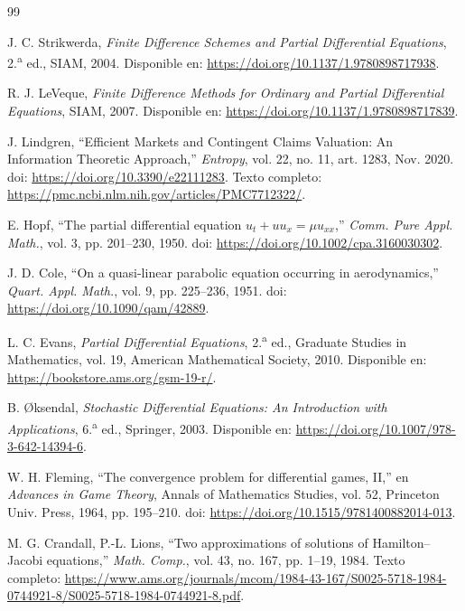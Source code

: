 \documentclass[11pt,letterpaper]{article}
\theoremstyle{plain}
\theoremstyle{definition}
\theoremstyle{remark}
\numberwithin{equation}{section}
\begin{document}
	\begin{thebibliography}{99}\small
		
		J. C. Strikwerda, \emph{Finite Difference Schemes and Partial Differential Equations}, 2.\textsuperscript{a} ed., SIAM, 2004.
		Disponible en: \url{https://doi.org/10.1137/1.9780898717938}.
		
		R. J. LeVeque, \emph{Finite Difference Methods for Ordinary and Partial Differential Equations}, SIAM, 2007.
		Disponible en: \url{https://doi.org/10.1137/1.9780898717839}.
		
		J. Lindgren, ``Efficient Markets and Contingent Claims Valuation: An Information Theoretic Approach,'' \emph{Entropy}, vol. 22, no. 11, art. 1283, Nov. 2020.
		doi: \url{https://doi.org/10.3390/e22111283}.
		Texto completo: \url{https://pmc.ncbi.nlm.nih.gov/articles/PMC7712322/}.
		
		E. Hopf, ``The partial differential equation \(u_t+uu_x=\mu u_{xx}\),'' \emph{Comm. Pure Appl. Math.}, vol. 3, pp. 201--230, 1950.
		doi: \url{https://doi.org/10.1002/cpa.3160030302}.
		
		J. D. Cole, ``On a quasi-linear parabolic equation occurring in aerodynamics,'' \emph{Quart. Appl. Math.}, vol. 9, pp. 225--236, 1951.
		doi: \url{https://doi.org/10.1090/qam/42889}.
		
		L. C. Evans, \emph{Partial Differential Equations}, 2.\textsuperscript{a} ed., Graduate Studies in Mathematics, vol. 19, American Mathematical Society, 2010.
		Disponible en: \url{https://bookstore.ams.org/gsm-19-r/}.
		
		B. {\O}ksendal, \emph{Stochastic Differential Equations: An Introduction with Applications}, 6.\textsuperscript{a} ed., Springer, 2003.
		Disponible en: \url{https://doi.org/10.1007/978-3-642-14394-6}.
		
		W. H. Fleming, ``The convergence problem for differential games, II,'' en \emph{Advances in Game Theory}, Annals of Mathematics Studies, vol. 52, Princeton Univ. Press, 1964, pp. 195--210.
		doi: \url{https://doi.org/10.1515/9781400882014-013}.
		
		M. G. Crandall, P.-L. Lions, ``Two approximations of solutions of Hamilton--Jacobi equations,'' \emph{Math. Comp.}, vol. 43, no. 167, pp. 1--19, 1984.
		Texto completo: \url{https://www.ams.org/journals/mcom/1984-43-167/S0025-5718-1984-0744921-8/S0025-5718-1984-0744921-8.pdf}.
		

\end{thebibliography}
\end{document}
